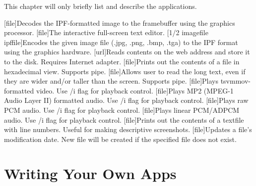 This chapter will only briefly list and describe the applications.

\begin{outline}
\1
\1
\1
\1
\1[file]{Decodes the IPF-formatted image to the framebuffer using the graphics processor.}
\1
\1[file]{The interactive full-screen text editor.}
\1[1/2 imagefile ipffile]{Encodes the given image file (.jpg, .png, .bmp, .tga) to the IPF format using the graphics hardware.}
\1
\1[url]{Reads contents on the web address and store it to the disk. Requires Internet adapter.}
\1[file]{Prints out the contents of a file in hexadecimal view. Supports pipe.}
\1[file]{Allows user to read the long text, even if they are wider and/or taller than the screen. Supports pipe.}
\1[file]{Plays tsvmmov-formatted video. Use /i flag for playback control.}
\1[file]{Plays MP2 (MPEG-1 Audio Layer II) formatted audio. Use /i flag for playback control.}
\1[file]{Plays raw PCM audio. Use /i flag for playback control.}
\1[file]{Plays linear PCM/ADPCM audio. Use /i flag for playback control.}
\1[file]{Prints out the contents of a textfile with line numbers. Useful for making descriptive screenshots.}
\1[file]{Updates a file's modification date. New file will be created if the specified file does not exist.}
\1
\1
\end{outline}



\chapter{Writing Your Own Apps}


